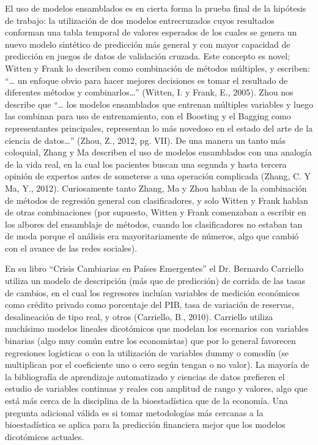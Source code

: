 \begin{spacing}{1.5}
El uso de modelos ensamblados es en cierta forma la prueba final de la hipótesis de trabajo: la utilización de dos modelos entrecruzados cuyos resultados conforman una tabla temporal de valores esperados de los cuales se genera un nuevo modelo sintético de predicción más general y con mayor capacidad de predicción en juegos de datos de validación cruzada. Este concepto es novel; Witten y Frank lo describen como combinación de métodos múltiples, y escriben: “… un enfoque obvio para hacer mejores decisiones es tomar el resultado de diferentes métodos y combinarlos…” (Witten, I. y Frank, E., 2005). Zhou nos describe que “… los modelos ensamblados que entrenan múltiples variables y luego las combinan para uso de entrenamiento, con el Boosting y el Bagging como representantes principales, representan lo más novedoso en el estado del arte de la ciencia de datos…” (Zhou, Z., 2012, pg. VII). De una manera un tanto más coloquial, Zhang y Ma describen el uso de modelos ensamblados con una analogía de la vida real, en la cual los pacientes buscan una segunda y hasta tercera opinión de expertos antes de someterse a una operación complicada (Zhang, C. Y Ma, Y., 2012). Curiosamente tanto Zhang, Ma y Zhou hablan de la combinación de métodos de regresión general con clasificadores, y solo Witten y Frank hablan de otras combinaciones (por supuesto, Witten y Frank comenzaban a escribir en los albores del ensamblaje de métodos, cuando los clasificadores no estaban tan de moda porque el análisis era mayoritariamente de números, algo que cambió con el avance de las redes sociales).

En su libro “Crisis Cambiarias en Países Emergentes” el Dr. Bernardo Carriello utiliza un modelo de descripción (más que de predicción) de corrida de las tasas de cambios, en el cual los regresores incluían variables de medición económicos como crédito privado como porcentaje del PIB, tasa de variación de reservas, desalineación de tipo real, y otros (Carriello, B., 2010). Carriello utiliza muchísimo modelos lineales dicotómicos que modelan los escenarios con variables binarias (algo muy común entre los economistas) que por lo general favorecen regresiones logísticas o con la utilización de variables dummy o comodín (se multiplican por el coeficiente uno o cero según tengan o no valor). La mayoría de la bibliografía de aprendizaje automatizado y ciencias de datos prefieren el estudio de variables continuas y reales con amplitud de rango y valores, algo que está más cerca de la disciplina de la bioestadística que de la economía. Una pregunta adicional válida es si tomar metodologías más cercanas a la bioestadística se aplica para la predicción financiera mejor que los modelos dicotómicos actuales.
 

\end{spacing}
